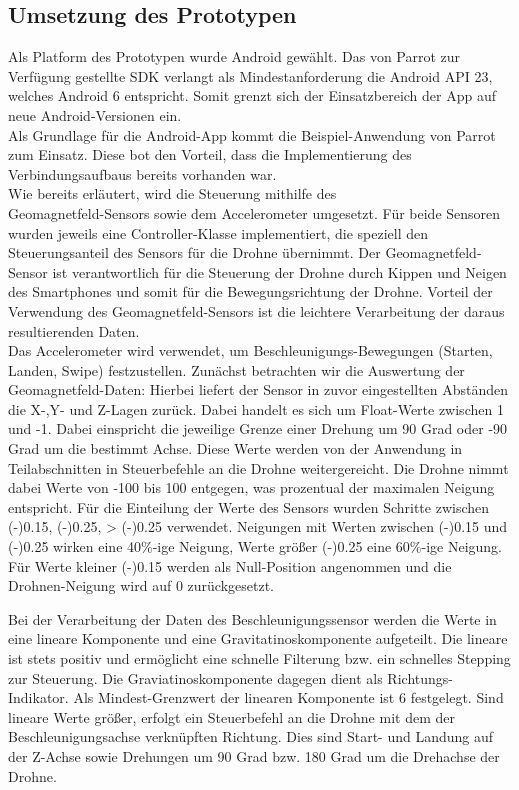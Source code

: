 \documentclass{article}
\begin{document}
\subsection{Umsetzung des Prototypen}
Als Platform des Prototypen wurde Android gewählt. Das von Parrot zur Verfügung gestellte SDK verlangt als Mindestanforderung die Android API 23, welches Android 6 entspricht.
Somit grenzt sich der Einsatzbereich der App auf neue Android-Versionen ein.\\
Als Grundlage für die Android-App kommt die Beispiel-Anwendung von Parrot zum Einsatz. Diese bot den Vorteil, dass die Implementierung des Verbindungsaufbaus bereits vorhanden war.
\\
Wie bereits erläutert, wird die Steuerung mithilfe des \\
Geomagnetfeld-Sensors sowie dem Accelerometer umgesetzt. Für beide Sensoren wurden jeweils eine Controller-Klasse implementiert,
die speziell den Steuerungsanteil des Sensors für die Drohne übernimmt.
Der Geomagnetfeld-Sensor ist verantwortlich für die Steuerung der Drohne durch Kippen und Neigen des Smartphones und somit für die Bewegungsrichtung der Drohne.
Vorteil der Verwendung des Geomagnetfeld-Sensors ist die leichtere Verarbeitung der daraus resultierenden Daten.\\
Das Accelerometer wird verwendet, um Beschleunigungs-Bewegungen (Starten, Landen, Swipe) festzustellen.
Zunächst betrachten wir die Auswertung der Geomagnetfeld-Daten: Hierbei liefert der Sensor in zuvor eingestellten Abständen die X-,Y- und Z-Lagen zurück. Dabei handelt es sich um Float-Werte
zwischen 1 und -1. Dabei einspricht die jeweilige Grenze einer Drehung um 90 Grad oder -90 Grad um die bestimmt Achse. Diese Werte werden von der Anwendung in Teilabschnitten in Steuerbefehle an die
Drohne weitergereicht. Die Drohne nimmt dabei Werte von -100 bis 100 entgegen, was prozentual der maximalen Neigung entspricht. Für die Einteilung der Werte des Sensors wurden Schritte zwischen
(-)0.15, (-)0.25, \textgreater{} (-)0.25 verwendet. Neigungen mit Werten zwischen (-)0.15 und (-)0.25 wirken eine 40\%-ige Neigung, Werte größer (-)0.25 eine 60\%-ige Neigung. Für Werte kleiner
(-)0.15 werden als Null-Position angenommen und die Drohnen-Neigung wird auf 0 zurückgesetzt.

Bei der Verarbeitung der Daten des Beschleunigungssensor werden die Werte in eine lineare Komponente und eine Gravitatinoskomponente aufgeteilt. Die lineare ist stets positiv und ermöglicht eine schnelle Filterung bzw. ein schnelles Stepping zur Steuerung. Die Graviatinoskomponente dagegen dient als Richtungs-Indikator.
Als Mindest-Grenzwert der linearen Komponente ist 6 festgelegt. Sind lineare Werte größer, erfolgt ein Steuerbefehl an die Drohne mit dem der Beschleunigungsachse verknüpften Richtung.
Dies sind Start- und Landung auf der Z-Achse sowie Drehungen um 90 Grad bzw. 180 Grad um die Drehachse der Drohne.
\end{document}
